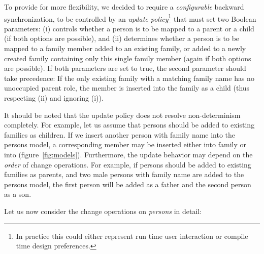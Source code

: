 To provide for more flexibility, we decided to require a \emph{configurable} backward synchronization, to be controlled by an \emph{update policy}\footnote{In practice this could either represent run time user interaction or compile time design preferences.} that must set two Boolean parameters:
(i)  controls whether a person is to be mapped to a parent or a child (if both options are possible), and (ii)  determines whether a person is to be mapped to a family member added to an existing family, or added to a newly created family containing only this single family member (again if both options are possible). 
If both parameters are set to true, the second parameter should take precedence: If the only existing family with a matching family name has no unoccupied parent role, the member is inserted into the family as a child (thus respecting (ii) and ignoring (i)).

It should be noted that the update policy does not resolve non-determinism completely. For example, let us assume that persons should be added to existing families as children. If we insert another person with family name  into the persons model, a corresponding member may be inserted either into family  or into  (figure~\ref{fig:models}). Furthermore, the update behavior may depend on the \emph{order} of change operations. For example, if persons should be added to existing families as parents, and two male persons with family name  are added to the persons model, the first person will be added as a father and the second person as a son. 


Let us now consider the change operations on \emph{persons} in detail:

